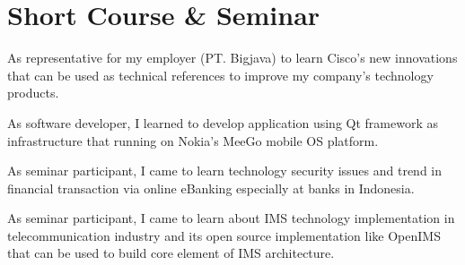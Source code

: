 \documentclass[10pt, a4paper]{moderncv}
\begin{document}
\section{Short Course \& Seminar}
{
    \begin{scriptsize}
        As representative for my employer (PT. Bigjava) to learn Cisco's new innovations that can be used as technical references to improve my
        company's technology products.
    \end{scriptsize}
}
{
    \begin{scriptsize}
        As software developer, I learned to develop application using Qt framework as infrastructure that running on Nokia's MeeGo mobile OS platform.
    \end{scriptsize}
}
{
    \begin{scriptsize}
        As seminar participant, I came to learn technology security issues and trend in financial transaction via online eBanking especially at
        banks in Indonesia.
    \end{scriptsize}
}
{
    \begin{scriptsize}
        As seminar participant, I came to learn about IMS technology implementation in telecommunication industry and its open source implementation
        like OpenIMS that can be used to build core element of IMS architecture.
    \end{scriptsize}
}
\end{document}
